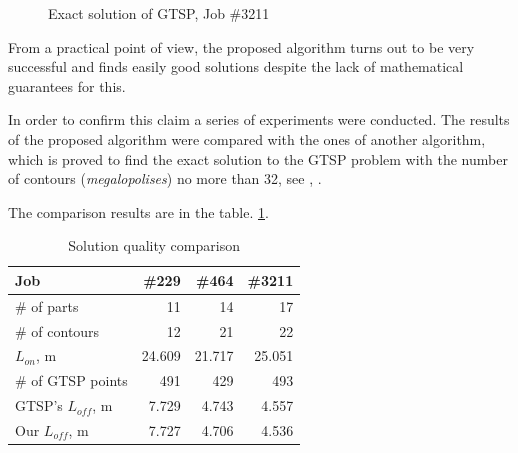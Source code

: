\documentclass{ifacconf}
\begin{document}
\begin{figure}
  \caption{Exact solution of GTSP, Job \#3211}
  \label{gtsp-path}
\end{figure}

From a practical point of view, the proposed algorithm
turns out to be very successful
and finds easily good solutions
despite the lack of mathematical guarantees for this.

In order to confirm this claim
a series of experiments were conducted.
The results of the proposed algorithm
were compared with the ones
of another algorithm,
which is proved to
find the exact solution to the GTSP problem
with the number of contours
(\textit{megalopolises}) no more than 32,
see
\cite{Chentsov2018Jul},
\cite{petunin2014local}.

The comparison results are in the table. \ref {exact-3}.

\begin{table}[h]
  \begin{center}
  \begin{tabular}{l|*{3}{r}}
      Job & \#229 & \#464 & \#3211 \\
      \hline
      \# of parts & 11 & 14 & 17\\
      \# of contours & 12 & 21 & 22 \\
      $L_{on}$, m & 24.609 & 21.717 & 25.051 \\
      \# of GTSP points & 491 & 429 & 493 \\
      GTSP's $L_{off}$, m & 7.729 & 4.743 & 4.557 \\
      Our $L_{off}$, m & 7.727 & 4.706 & 4.536 \\
  \end{tabular}
  \caption{Solution quality comparison}
  \label{exact-3}
  \end{center}
\end{table}
\end{document}
